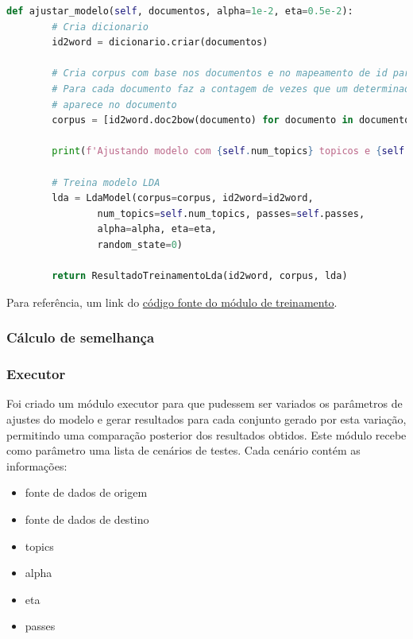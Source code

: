 \begin{lstlisting}[language=Python, style=mystyle, frame=lines, caption=Código fonte: Treinamento de modelo usando LDA]
    def ajustar_modelo(self, documentos, alpha=1e-2, eta=0.5e-2):
        # Cria dicionario
        id2word = dicionario.criar(documentos)

        # Cria corpus com base nos documentos e no mapeamento de id para palavra
        # Para cada documento faz a contagem de vezes que um determinado topico
        # aparece no documento
        corpus = [id2word.doc2bow(documento) for documento in documentos]

        print(f'Ajustando modelo com {self.num_topics} topicos e {self.passes} passes')

        # Treina modelo LDA        
        lda = LdaModel(corpus=corpus, id2word=id2word, 
                num_topics=self.num_topics, passes=self.passes, 
                alpha=alpha, eta=eta,
                random_state=0)

        return ResultadoTreinamentoLda(id2word, corpus, lda)
\end{lstlisting}

Para referência, um link do \href{https://github.com/heldergr/tcc-pucmg-2/blob/main/src/python/notebooks/treinamento/treinamento_lda.py}{código fonte do módulo de treinamento}.

\subsubsection{Cálculo de semelhança}

\subsubsection{Executor}

Foi criado um módulo executor para que pudessem ser variados os parâmetros de ajustes do modelo e gerar resultados para cada conjunto gerado por esta variação, permitindo uma comparação posterior dos resultados obtidos.
Este módulo recebe como parâmetro uma lista de cenários de testes. Cada cenário contém as informações:
\begin{itemize}
    \item fonte de dados de origem
    \item fonte de dados de destino
    \item topics
    \item alpha
    \item eta
    \item passes
\end{itemize}


